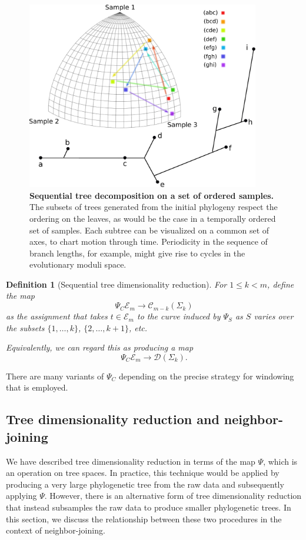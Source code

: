 \documentclass[a4paper,11pt]{article}
\newtheorem{definition}{Definition}
\newcommand{\aC}{\mathcal{C}}
\newcommand{\aD}{\mathcal{D}}
\newcommand{\aE}{\mathcal{E}}
\begin{document}
\begin{figure}
    \centering
    \includegraphics[width=4in]{../figures/dimred_def4.pdf}
    \caption{{\bf Sequential tree decomposition on a set of ordered samples.} The subsets of trees generated from the initial phylogeny respect the ordering on the leaves, as would be the case in a temporally ordered set of samples. Each subtree can be visualized on a common set of axes, to chart motion through time. Periodicity in the sequence of branch lengths, for example, might give rise to cycles in the evolutionary moduli space.}
    \label{fig:dimred_def4}
\end{figure} 

\begin{definition}[Sequential tree dimensionality reduction]
For $1 \leq k < m$, define the map
\[
\Psi_C \aE_m \to \aC_{m-k}(\Sigma_k)
\]
as the assignment that takes $t \in \aE_m$ to the curve induced by
$\Psi_S$ as $S$ varies over the subsets $\{1, \ldots, k\}$, $\{2,
\ldots, k+1\}$, etc.

Equivalently, we can regard this as producing a map
\[
\Psi_C \aE_m \to \aD(\Sigma_k).
\]
\end{definition}

There are many variants of $\Psi_C$ depending on the precise strategy
for windowing that is employed.

\subsection{Tree dimensionality reduction and neighbor-joining}

We have described tree dimensionality reduction in terms of the map $\Psi$, which is an operation on tree spaces.
In practice, this technique would be applied by producing a very large phylogenetic tree from the raw data and subsequently applying $\Psi$.
However, there is an alternative form of tree dimensionality reduction that instead subsamples the raw data to produce smaller phylogenetic trees.
In this section, we discuss the relationship between these two procedures in the context of neighbor-joining.
\end{document}
